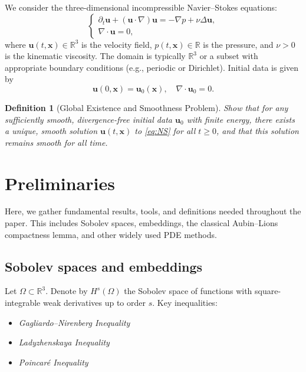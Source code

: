 \documentclass[11pt]{article}
\newtheorem{definition}[theorem]{Definition}
\numberwithin{equation}{section}
\begin{document}
We consider the three-dimensional incompressible Navier--Stokes equations:
\begin{equation}\label{eq:NS}
\begin{cases}
\partial_t \mathbf{u} + (\mathbf{u}\cdot \nabla)\mathbf{u}
  = -\nabla p + \nu \Delta \mathbf{u}, \\
\nabla \cdot \mathbf{u} = 0,
\end{cases}
\end{equation}
where \( \mathbf{u}(t,\mathbf{x}) \in \mathbb{R}^3 \) is the velocity field,
\( p(t,\mathbf{x}) \in \mathbb{R} \) is the pressure, and \( \nu > 0 \) is the
kinematic viscosity. The domain is typically \( \mathbb{R}^3 \) or a subset
with appropriate boundary conditions (e.g., periodic or Dirichlet). Initial data
is given by
\[
\mathbf{u}(0,\mathbf{x}) = \mathbf{u}_0(\mathbf{x}),
\quad \nabla \cdot \mathbf{u}_0 = 0.
\]

\begin{definition}[Global Existence and Smoothness Problem]
Show that for any sufficiently smooth, divergence-free initial data
\(\mathbf{u}_0\) with finite energy, there exists a unique, smooth solution
\(\mathbf{u}(t,\mathbf{x})\) to \eqref{eq:NS} for all \( t \ge 0 \),
and that this solution remains smooth for all time.
\end{definition}

\section{Preliminaries}\label{sec:prelims}

Here, we gather fundamental results, tools, and definitions needed throughout
the paper. This includes Sobolev spaces, embeddings, the classical Aubin--Lions
compactness lemma, and other widely used PDE methods.

\subsection{Sobolev spaces and embeddings}

Let \(\Omega \subset \mathbb{R}^3\). Denote by \(H^s(\Omega)\) the Sobolev space
of functions with square-integrable weak derivatives up to order \(s\).
Key inequalities:
\begin{itemize}[leftmargin=2em]
\item \emph{Gagliardo--Nirenberg Inequality}
\item \emph{Ladyzhenskaya Inequality}
\item \emph{Poincar\'{e} Inequality}
\end{itemize}
\end{document}
